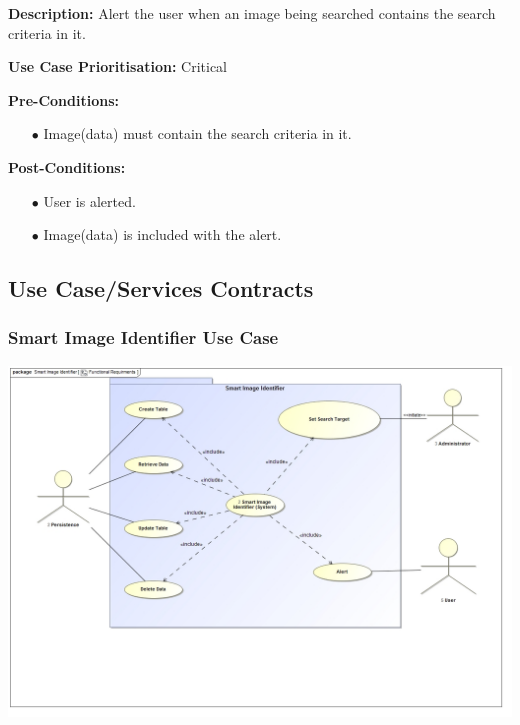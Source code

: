 \documentclass[a4paper,12pt]{report}
\begin{document}
\begin{itemize}
		\textbf{Description:} Alert the user when an image being searched contains the search criteria in it.\newline
		
		\textbf{Use Case Prioritisation:} Critical\newline

		\textbf{Pre-Conditions:}
		\begin{itemize}
			\item[$\bullet$]Image(data) must contain the search criteria in it.
			\\
		\end{itemize}
		\textbf{Post-Conditions: }
		\begin{itemize}
			\item[$\bullet$]User is alerted.
			\item[$\bullet$]Image(data) is included with the alert.
			\\
		\end{itemize}
	\end{itemize}
\subsection{Use Case/Services Contracts}
	\subsubsection{Smart Image Identifier Use Case}
	\includegraphics[width=1\textwidth]{./FunctionalRequirments.jpg}\\[1.5cm]
\end{document}
